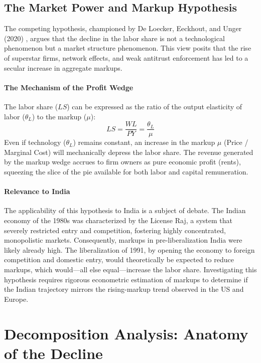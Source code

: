\documentclass[12pt]{article}
\begin{document}
\subsection{The Market Power and Markup Hypothesis}
The competing hypothesis, championed by De Loecker, Eeckhout, and Unger (2020) \citep{DeLoecker2020}, argues that the decline in the labor share is not a technological phenomenon but a market structure phenomenon. This view posits that the rise of superstar firms, network effects, and weak antitrust enforcement has led to a secular increase in aggregate markups.

\paragraph{The Mechanism of the Profit Wedge}
The labor share ($LS$) can be expressed as the ratio of the output elasticity of labor ($\theta_L$) to the markup ($\mu$):
\[
LS = \frac{WL}{PY} = \frac{\theta_L}{\mu}
\]
Even if technology ($\theta_L$) remains constant, an increase in the markup $\mu$ (Price / Marginal Cost) will mechanically depress the labor share. The revenue generated by the markup wedge accrues to firm owners as pure economic profit (rents), squeezing the slice of the pie available for both labor and capital remuneration.

\paragraph{Relevance to India}
The applicability of this hypothesis to India is a subject of debate. The Indian economy of the 1980s was characterized by the License Raj, a system that severely restricted entry and competition, fostering highly concentrated, monopolistic markets. Consequently, markups in pre-liberalization India were likely already high. The liberalization of 1991, by opening the economy to foreign competition and domestic entry, would theoretically be expected to reduce markups, which would—all else equal—increase the labor share. Investigating this hypothesis requires rigorous econometric estimation of markups to determine if the Indian trajectory mirrors the rising-markup trend observed in the US and Europe.

\newpage
\section{Decomposition Analysis: Anatomy of the Decline}
\end{document}
